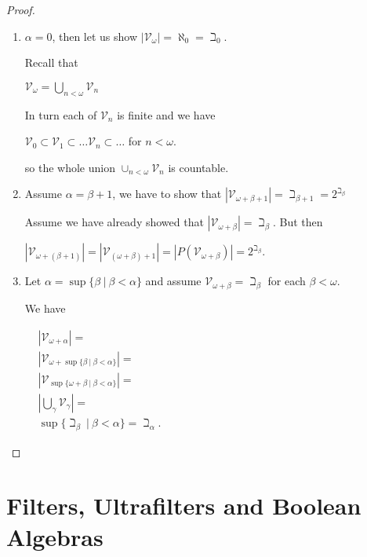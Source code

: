 \documentclass[8pt]{article}
\theoremstyle{definition}
\theoremstyle{definition}
\theoremstyle{definition}
\theoremstyle{definition}
\theoremstyle{definition}
\theoremstyle{definition}
\theoremstyle{definition}
\theoremstyle{definition}
\theoremstyle{definition}
\theoremstyle{definition}
\theoremstyle{definition}
\theoremstyle{definition}
\theoremstyle{definition}
\theoremstyle{definition}
\theoremstyle{question}
\begin{document}
\begin{proof}

  \begin{enumerate}
    \item $\alpha = 0$, then let us show $|\mathcal{V}_{\omega}| = \aleph_0 = \beth_0$.

    Recall that 
    \begin{center}
      $\mathcal{V}_{\omega} = \bigcup \limits_{n < \omega} \mathcal{V}_n$
    \end{center}
    In turn each of $\mathcal{V}_n$ is finite and we have
    \begin{center}
      $\mathcal{V}_0 \subset \mathcal{V}_1 \subset \dots \mathcal{V}_n \subset \dots$ for $n < \omega$.
    \end{center}
    so the whole union $\cup_{n < \omega} \mathcal{V}_n$ is countable.
    \item Assume $\alpha = \beta + 1$, we have to show that $|\mathcal{V}_{\omega + \beta + 1}| = \beth_{\beta + 1} = 2^{\beth_{\beta}}$

    Assume we have already showed that $|\mathcal{V}_{\omega + \beta}| = \beth_{\beta}$. But then
    
    \begin{center}
    $|\mathcal{V}_{\omega + (\beta + 1)}| = |\mathcal{V}_{(\omega + \beta) + 1}| = |P(\mathcal{V}_{\omega + \beta})| = 2^{\beth_{\beta}}$.
    \end{center}
    \item Let $\alpha = \sup \{\beta \: | \: \beta < \alpha \}$
    and assume $\mathcal{V}_{\omega + \beta} = \beth_{\beta}$ for each $\beta < \omega$.

    We have

    $\begin{array}{lll}
      & |\mathcal{V}_{\omega + \alpha}| = & \\
      & |\mathcal{V}_{\omega + \sup \{ \beta \: | \: \beta < \alpha\}}| = & \\
      & |\mathcal{V}_{\sup \{ \omega + \beta \: | \: \beta < \alpha \}} |= & \\
      & |\bigcup \limits_{\gamma} \mathcal{V}_{\gamma} | = & \\
      & \sup \{ \beth_{\beta} \: | \: \beta < \alpha\} = \beth_{\alpha}.&
    \end{array}$
  \end{enumerate}
\end{proof}

\section{Filters, Ultrafilters and Boolean Algebras}
\end{document}
